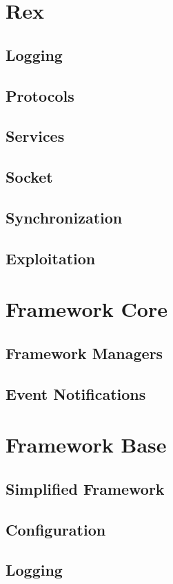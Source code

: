 \documentclass{report}
\begin{document}
    \section{Rex}
        \subsection{Logging}
        \subsection{Protocols}
        \subsection{Services}
        \subsection{Socket}
        \subsection{Synchronization}
        \subsection{Exploitation}
    \section{Framework Core}
        \subsection{Framework Managers}
        \subsection{Event Notifications}
    \section{Framework Base}
        \subsection{Simplified Framework}
        \subsection{Configuration}
        \subsection{Logging}
\end{document}
